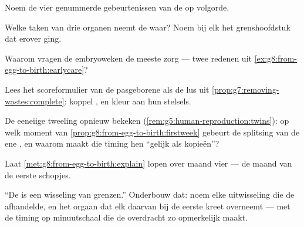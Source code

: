 \begin{exercise}[$\star$]\label{exo:g8:from-egg-to-birth:6}
Noem de vier genummerde gebeurtenissen van de  op volgorde.
\end{exercise}

\begin{exercise}[$\star\star$]\label{exo:g8:from-egg-to-birth:7}
Welke taken van drie organen neemt de  waar? Noem bij elk het
grenshoofdstuk dat erover ging.
\end{exercise}

\begin{exercise}[$\star\star$]\label{exo:g8:from-egg-to-birth:8}
Waarom vragen de embryoweken de meeste zorg --- twee redenen uit
\cref{ex:g8:from-egg-to-birth:earlycare}?
\end{exercise}

\begin{exercise}[$\star\star$]\label{exo:g8:from-egg-to-birth:9}
Lees het scoreformulier van de pasgeborene als de lus uit
\cref{prop:g7:removing-wastes:complete}: koppel ,  en
kleur aan hun stelsels.
\end{exercise}

\begin{exercise}[$\star\star$]\label{exo:g8:from-egg-to-birth:10}
De eeneiige tweeling opnieuw bekeken
(\cref{rem:g5:human-reproduction:twins}): op welk moment van
\cref{prop:g8:from-egg-to-birth:firstweek} gebeurt de splitsing van de ene
, en waarom maakt die timing hen ``gelijk als kopieën''?
\end{exercise}

\begin{exercise}[$\star\star$]\label{exo:g8:from-egg-to-birth:11}
Laat \cref{met:g8:from-egg-to-birth:explain} lopen over maand vier --- de
maand van de eerste schopjes.
\end{exercise}

\begin{exercise}[$\star\star\star$]\label{exo:g8:from-egg-to-birth:12}
``De  is een wisseling van grenzen.'' Onderbouw dat: noem elke
uitwisseling die de  afhandelde, en het orgaan dat elk daarvan bij
de eerste kreet overneemt --- met de timing op minuutschaal die de
overdracht zo opmerkelijk maakt.
\end{exercise}

